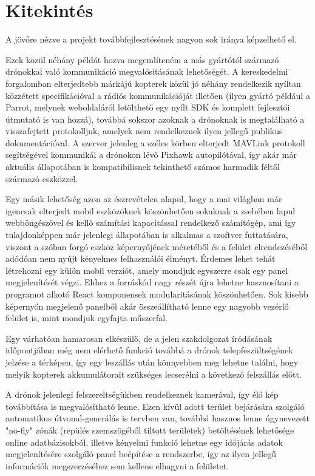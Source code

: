 \section{Kitekintés}

A jövőre nézve a projekt továbbfejlesztésének nagyon sok iránya képzelhető el.

Ezek közül néhány példát hozva megemlíteném a más gyártótól származó drónokkal
való kommunikáció megvalósításának lehetőségét. A kereskedelmi forgalomban
elterjedtebb márkájú kopterek közül jó néhány rendelkezik nyíltan közzétett
specifikációval a rádiós kommunikációját illetően (ilyen gyártó például a
Parrot, melynek weboldaláról letölthető egy nyílt SDK és komplett fejlesztői
útmutató is van hozzá), továbbá sokszor azoknak a drónoknak is megtalálható a
visszafejtett protokolljuk, amelyek nem rendelkeznek ilyen jellegű publikus
dokumentációval. A szerver jelenleg a széles körben elterjedt MAVLink protokoll
segítségével kommunikál a drónokon lévő Pixhawk autopilótával, így akár már
aktuális állapotában is kompatibilisnek tekinthető számos harmadik féltől
származó eszközzel.

Egy másik lehetőség azon az észrevételen alapul, hogy a mai világban már
igencsak elterjedt mobil eszközöknek köszönhetően sokaknak a zsebében lapul
webböngészővel és kellő számítási kapacitással rendelkező számítógép, ami így
tulajdonképpen már jelenlegi állapotában is alkalmas a szoftver futtatására,
viszont a szóban forgó eszköz képernyőjének méretéből és a felület
elrendezéséből adódóan nem nyújt kényelmes felhasználói élményt. Érdemes lehet
tehát létrehozni egy külön mobil verziót, amely mondjuk egyszerre csak egy panel
megjelenítését végzi. Ehhez a forráskód nagy részét újra lehetne hasznosítani a
programot alkotó React komponensek modularitásának köszönhetően. Sok kisebb
képernyőn megjelenő panelből akár összeállítható lenne egy nagyobb vezérlő
felület is, mint mondjuk egyfajta műszerfal.

Egy várhatóan hamarosan elkészülő, de a jelen szakdolgozat íródásának
időpontjában még nem elérhető funkció továbbá a drónok telepfeszültségének
jelzése a térképen, így egy leszállás után könnyebben meg lehetne találni, hogy
melyik kopterek akkumulátorait szükséges lecserélni a következő felszállás
előtt.

A drónok jelenlegi felszereltségükben rendelkeznek kamerával, így élő kép
továbbítása is megvalósítható lenne. Ezen kívül adott terület bejárására
szolgáló automatikus útvonal-generálás is tervben van, továbbá hasznos lenne
úgynevezett "no-fly" zónák (repülés szemszögéből tiltott területek) betöltésének
lehetősége online adatbázisokból, illetve kényelmi funkció lehetne egy időjárás
adatok megjelenítésére szolgáló panel beépítése a rendszerbe, így az ilyen
jellegű információk megszerzéséhez sem kellene elhagyni a felületet.
